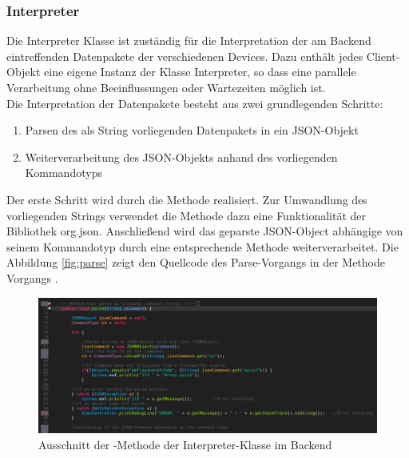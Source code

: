 \subsubsection{Interpreter}
Die Interpreter Klasse ist zuständig für die Interpretation der am Backend eintreffenden Datenpakete der verschiedenen Devices. Dazu enthält
jedes Client-Objekt eine eigene Instanz der Klasse Interpreter, so dass eine parallele Verarbeitung ohne Beeinflussungen oder Wartezeiten 
möglich ist. \\
Die Interpretation der Datenpakete besteht aus zwei grundlegenden Schritte:
\begin{enumerate}
	\item{Parsen des als String vorliegenden Datenpakets in ein JSON-Objekt}
	\item{Weiterverarbeitung des JSON-Objekts anhand des vorliegenden Kommandotyps}
\end{enumerate}
Der erste Schritt wird durch die Methode  realisiert. Zur Umwandlung des vorliegenden Strings verwendet
die Methode dazu eine Funktionalität der Bibliothek org.json. Anschließend wird das geparste JSON-Object abhängige von seinem
Kommandotyp durch eine entsprechende Methode weiterverarbeitet.
\newpage
\noindent
Die Abbildung \eqref{fig:parse} zeigt den Quellcode des Parse-Vorgangs in der Methode Vorgangs .
\begin{figure}[ht]
	\centering
	\includegraphics[width=1.0\textwidth]{images/implementation/InterpreterParseMethod.png}
	\caption[Ausschnitt der -Methode der Interpreter-Klasse im Backend]{Ausschnitt der -Methode der Interpreter-Klasse im Backend}
	\label{fig:parse}
\end{figure}
